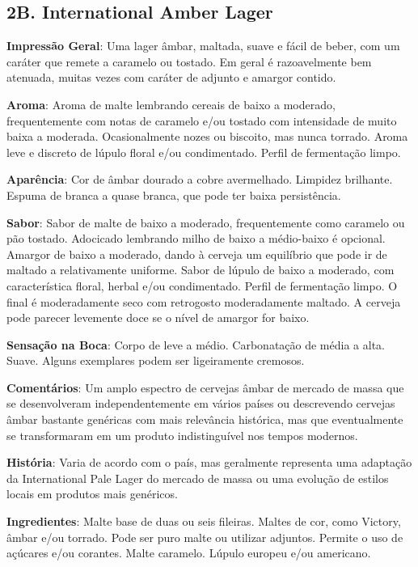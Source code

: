 \subsection*{2B. International Amber Lager}
\textbf{Impressão Geral}: Uma lager âmbar, maltada, suave e fácil de beber, com um caráter que remete a caramelo ou tostado. Em geral é razoavelmente bem atenuada, muitas vezes com caráter de adjunto e amargor contido.

\textbf{Aroma}: Aroma de malte lembrando cereais de baixo a moderado, frequentemente com notas de caramelo e/ou tostado com intensidade de muito baixa a moderada. Ocasionalmente nozes ou biscoito, mas nunca torrado. Aroma leve e discreto de lúpulo floral e/ou condimentado. Perfil de fermentação limpo.

\textbf{Aparência}: Cor de âmbar dourado a cobre avermelhado. Limpidez brilhante. Espuma de branca a quase branca, que pode ter baixa persistência.

\textbf{Sabor}: Sabor de malte de baixo a moderado, frequentemente como caramelo ou pão tostado. Adocicado lembrando milho de baixo a médio-baixo é opcional. Amargor de baixo a moderado, dando à cerveja um equilíbrio que pode ir de maltado a relativamente uniforme. Sabor de lúpulo de baixo a moderado, com característica floral, herbal e/ou condimentado. Perfil de fermentação limpo. O final é moderadamente seco com retrogosto moderadamente maltado. A cerveja pode parecer levemente doce se o nível de amargor for baixo.

\textbf{Sensação na Boca}: Corpo de leve a médio. Carbonatação de média a alta. Suave. Alguns exemplares podem ser ligeiramente cremosos.

\textbf{Comentários}: Um amplo espectro de cervejas âmbar de mercado de massa que se desenvolveram independentemente em vários países ou descrevendo cervejas âmbar bastante genéricas com mais relevância histórica, mas que eventualmente se transformaram em um produto indistinguível nos tempos modernos.

\textbf{História}: Varia de acordo com o país, mas geralmente representa uma adaptação da International Pale Lager do mercado de massa ou uma evolução de estilos locais em produtos mais genéricos.

\textbf{Ingredientes}: Malte base de duas ou seis fileiras. Maltes de cor, como Victory, âmbar e/ou torrado. Pode ser puro malte ou utilizar adjuntos. Permite o uso de açúcares e/ou corantes. Malte caramelo. Lúpulo europeu e/ou americano.

